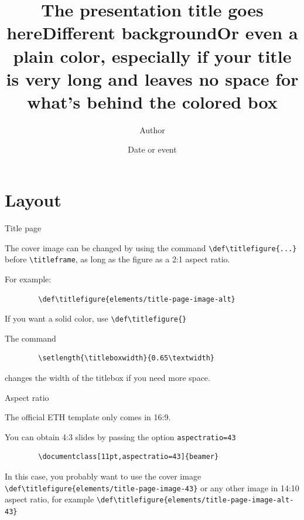 \documentclass[11pt,aspectratio=169]{beamer}
\title{The presentation title goes here}
\date[ABC 2021]{Date or event}
\author{Author}
\institute{Organizational Unit\\can spread over 2 lines}
\begin{document}

\titleframe

\def\titlefigure{elements/title-page-image-alt}
\title{Different background}
\titleframe

\def\titlefigure{}
\setlength{\titleboxwidth}{0.75\textwidth}			%
\title{Or even a plain color, especially if your title is very long and leaves no space for what's behind the colored box}
\titleframe

\tocframe

\section{Layout}

\begin{frame}[fragile]{Title page}

	The cover image can be changed by using the command \verb+\def\titlefigure{...}+ before \verb+\titleframe+, as long as the figure as a 2:1 aspect ratio.
	
	For example:
	\begin{verbatim}
		\def\titlefigure{elements/title-page-image-alt}
	\end{verbatim}
	
	\medskip
	
	If you want a solid color, use \verb+\def\titlefigure{}+
	
	\medskip

	The command	
	\begin{verbatim}
		\setlength{\titleboxwidth}{0.65\textwidth}
	\end{verbatim}
	changes the width of the titlebox if you need more space.

\end{frame}

\begin{frame}[fragile]{Aspect ratio}

	The official ETH template only comes in 16:9.
	
	You can obtain 4:3 slides by passing the option \verb+aspectratio=43+
	\begin{verbatim}
		\documentclass[11pt,aspectratio=43]{beamer}	
	\end{verbatim}
		
	\bigskip
	
	In this case, you probably want to use the cover image \verb+\def\titlefigure{elements/title-page-image-43}+
	or any other image in 14:10 aspect ratio, for example \verb+\def\titlefigure{elements/title-page-image-alt-43}+
	
	
\end{frame}
\end{document}
